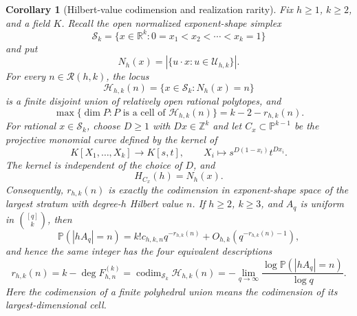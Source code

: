 \documentclass[11pt,reqno]{amsart}
\newtheorem{corollary}[theorem]{Corollary}
\theoremstyle{definition}
\theoremstyle{remark}
\begin{document}
\begin{corollary}[Hilbert-value codimension and realization rarity]
\label{cor:hilbert-strata}
Fix $h\geq1$, $k\geq2$, and a field $K$.  Recall the open normalized
exponent-shape simplex
\[
 \mathcal S_k=
 \{x\in\mathbb R^k:0=x_1<x_2<\cdots<x_k=1\}
\]
and put
\[
 N_h(x)=\left|\{u\cdot x:u\in\mathcal U_{h,k}\}\right|.
\]
For every $n\in\mathcal R(h,k)$, the locus
\[
 \mathcal H_{h,k}(n)=\{x\in\mathcal S_k:N_h(x)=n\}
\]
is a finite disjoint union of relatively open rational polytopes, and
\begin{equation}\label{eq:hilbert-stratum-dimension}
 \max\{\dim P:P\text{ is a cell of }\mathcal H_{h,k}(n)\}
 =k-2-r_{h,k}(n).
\end{equation}
For rational $x\in\mathcal S_k$, choose $D\geq1$ with
$Dx\in\mathbb Z^k$ and let $C_x\subset\mathbb P^{k-1}$ be the projective
monomial curve defined by the kernel of
\[
 K[X_1,\ldots,X_k]\longrightarrow K[s,t],
 \qquad X_i\longmapsto s^{D(1-x_i)}t^{Dx_i}.
\]
The kernel is independent of the choice of $D$, and
\[
 H_{C_x}(h)=N_h(x).
\]
Consequently, $r_{h,k}(n)$ is exactly the codimension in exponent-shape
space of the largest stratum with degree-$h$ Hilbert value $n$.
If $h\geq2$, $k\geq3$, and $A_q$ is uniform in $\binom{[q]}k$, then
\begin{equation}\label{eq:rank-codimension-rarity}
 \mathbb P(|hA_q|=n)
 =k!c_{h,k,n}q^{-r_{h,k}(n)}
  +O_{h,k}(q^{-r_{h,k}(n)-1}),
\end{equation}
and hence the same integer has the four equivalent descriptions
\begin{equation}\label{eq:four-way-rank-identity}
 \boxed{
 r_{h,k}(n)
 =k-\deg F^{(k)}_{h,n}
 =\operatorname{codim}_{\mathcal S_k}\mathcal H_{h,k}(n)
 =-\lim_{q\to\infty}
   \frac{\log\mathbb P(|hA_q|=n)}{\log q}.}
\end{equation}
Here the codimension of a finite polyhedral union means the codimension of
its largest-dimensional cell.
\end{corollary}
\end{document}
